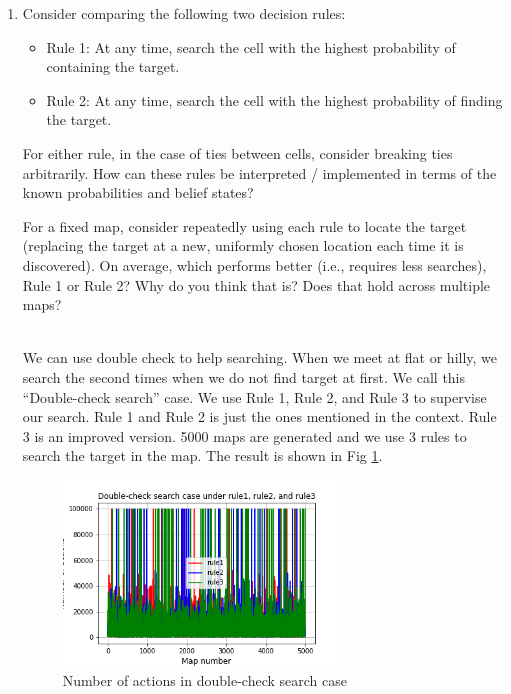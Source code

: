 \documentclass[letter]{article}
\begin{document}
\begin{enumerate}
	\item {Consider comparing the following two decision rules:
		\begin{itemize}
			\item {Rule 1: At any time, search the cell with the highest probability of containing the target.}
			\item {Rule 2: At any time, search the cell with the highest probability of finding the target.}
		\end{itemize} 
		\par{For either rule, in the case of ties between cells, consider breaking ties arbitrarily. How can these rules be interpreted / implemented in terms of the known probabilities and belief states?}
		\par{For a fixed map, consider repeatedly using each rule to locate the target (replacing the target at a new,
			uniformly chosen location each time it is discovered). On average, which performs better (i.e., requires less
			searches), Rule 1 or Rule 2? Why do you think that is? Does that hold across multiple maps?}
		} \\
	
	We can use double check to help searching. When we meet at flat or hilly, we search the
	second times when we do not find target at first. We call this “Double-check search”
	case. We use Rule 1, Rule 2, and Rule 3 to supervise our search. Rule 1 and Rule 2 is
	just the ones mentioned in the context. Rule 3 is an improved version. 5000 maps are
	generated and we use 3 rules to search the target in the map. The result is shown in Fig \ref{fig:part1-q345.png}.
	
	\begin{figure}[H]
		\centering
		\includegraphics[width=0.7\textwidth]{fig/part1-q345.png}
		\caption{Number of actions in double-check search case}
		\label{fig:part1-q345.png}
	\end{figure}
	

\end{enumerate}
\end{document}
